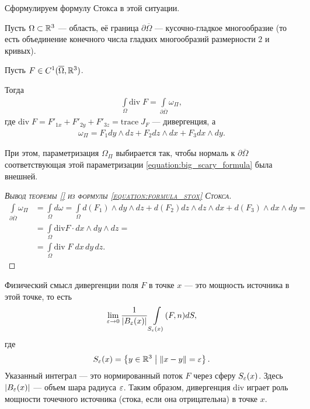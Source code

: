 Сформулируем формулу Стокса в этой ситуации.

\begin{thm}
Пусть $\Omega \subset \mathbb{R}^{3}$  --- область, её граница $\partial \overline \Omega$  --- кусочно-гладкое многообразие (то есть объединение конечного числа гладких многообразий размерности $2$ и кривых).

Пусть $F \in C^{1}(\overline \Omega, \mathbb{R}^{3})$.

Тогда
\begin{align*}
 \int\limits_{\Omega} \mathrm{div}\;F  = \int\limits_{\partial \overline \Omega} \omega_{\Pi}
,\end{align*} где $\mathrm{div}\;F = F'_{1x} + F'_{2y} + F'_{3z} = \mathrm{trace}\;J_F$ --- дивергенция, а
\begin{align*}
 \omega_{\Pi} = F_1 dy \land dz + F_2 dz \land dx + F_3 dx \land dy
.\end{align*}

При этом, параметризация $\Omega_{\Pi}$ выбирается так, чтобы нормаль к $\partial \overline \Omega$ соответствующая этой параметризации \eqref{equation:big_scary_formula} была внешней.
\end{thm}
\begin{proof}[\normalfont\textsc{Вывод теоремы \ref{} из формулы \eqref{equation:formula_stox} Стокса}]
 \begin{align*}
  \int\limits_{\partial \overline \Omega} \omega_{\Pi} &= \int\limits_{\Omega} d \omega = \int\limits_{\Omega} d(F_1) \land dy \land dz + d(F_2) dz \land dz \land dx + d(F_3) \land dx \land dy = \\
  &= \int\limits_{\Omega} \mathrm{div} F \cdot dx \land dy \land dz = \\
  &= \int\limits_{\Omega} \mathrm{div}\; F\; dx \, dy \, dz
 .\end{align*} 
\end{proof}

\begin{remrk*}
Физический смысл дивергенции поля $F$ в точке $x$ --- это мощность источника в этой точке, то есть
\begin{align*}
 \lim_{\varepsilon \to 0}  \frac{1}{\left| B_{\varepsilon}(x) \right|} \int\limits_{S_{\varepsilon}(x)} (F, n) dS
,\end{align*} где \begin{align*}
S_{\varepsilon}(x) = \left\{ y \in \mathbb{R}^{3} \;\middle|\; \left\| x - y \right\| = \varepsilon \right\}
.\end{align*} 
Указанный интеграл --- это нормированный поток $F$ через сферу $S_{\varepsilon}(x)$. Здесь $\left| B_{\varepsilon}(x) \right|$ --- объем шара радиуса $\varepsilon$. Таким образом, дивергенция $\mathrm{div}$ играет роль мощности точечного источника (стока, если она отрицательна) в точке $x$.
\end{remrk*}

